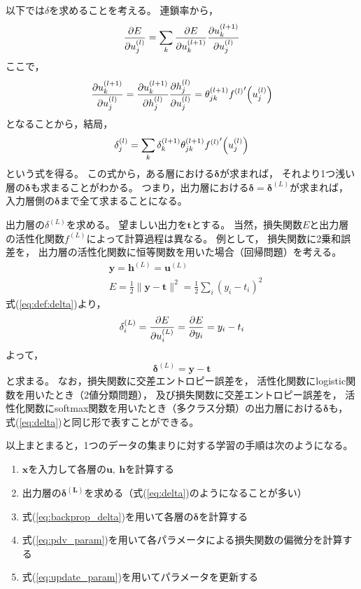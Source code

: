 \documentclass[class=jsarticle, crop=false, dvipdfmx, fleqn]{standalone}
\begin{document}
以下では$\delta$を求めることを考える。
連鎖率から，
\begin{equation}
\pdv{E}{u_j^{(l)}} = \sum_k \pdv{E}{u_k^{(l+1)}} \pdv{u_k^{(l+1)}}{u_{j}^{(l)}}
\end{equation}
ここで，
\begin{equation}
\pdv{u_k^{(l+1)}}{u_{j}^{(l)}}
	= \pdv{u_k^{(l+1)}}{h_{j}^{(l)}} \pdv{h_j^{(l)}}{u_{j}^{(l)}}
	= \theta_{jk}^{(l+1)} {f^{(l)}}^\prime \qty(u_{j}^{(l)})
\end{equation}
となることから，結局，
\begin{equation}
\delta_j^{(l)} = \sum_k \delta_k^{(l+1)} \theta_{jk}^{(l+1)} {f^{(l)}}^\prime \qty(u_{j}^{(l)})
\label{eq:backprop_delta}
\end{equation}
という式を得る。
この式から，ある層における$\bm{\delta}$が求まれば，
それより1つ浅い層の$\bm{\delta}$も求まることがわかる。
つまり，出力層における$\bm{\delta} = \bm{\delta}^{(L)}$が求まれば，
入力層側の$\bm{\delta}$まで全て求まることになる。

出力層の$\delta^{(L)}$を求める。
望ましい出力を$\bm{t}$とする。
当然，損失関数$E$と出力層の活性化関数$f^{(L)}$によって計算過程は異なる。
例として，
損失関数に2乗和誤差を，
出力層の活性化関数に恒等関数を用いた場合（回帰問題）を考える。
\begin{align}
& \bm{y} = \bm{h}^{(L)} = \bm{u}^{(L)} \\
& E = \frac{1}{2} \| \bm{y} - \bm{t} \|^2 = \frac{1}{2} \sum_i (y_i - t_i)^2
\end{align}
式(\ref{eq:def:delta})より，
\begin{equation}
\delta_i^{(L)} = \pdv{E}{u_i^{(L)}} = \pdv{E}{y_i} = y_i - t_i
\end{equation}
よって，
\begin{equation}
\bm{\delta}^{(L)} = \bm{y - t}
\label{eq:delta}
\end{equation}
と求まる。
なお，損失関数に交差エントロピー誤差を，
活性化関数にlogistic関数を用いたとき（2値分類問題），
及び損失関数に交差エントロピー誤差を，
活性化関数にsoftmax関数を用いたとき（多クラス分類）の出力層における$\bm{\delta}$も，
式(\ref{eq:delta})と同じ形で表すことができる。

以上まとまると，1つのデータの集まりに対する学習の手順は次のようになる。

\begin{enumerate}
\item $\bm{x}$を入力して各層の$\bm{u},\ \bm{h}$を計算する
\item 出力層の$\bm{\delta^{(L)}}$を求める（式(\ref{eq:delta})のようになることが多い）
\item 式(\ref{eq:backprop_delta})を用いて各層の$\bm{\delta}$を計算する
\item 式(\ref{eq:pdv_param})を用いて各パラメータによる損失関数の偏微分を計算する
\item 式(\ref{eq:update_param})を用いてパラメータを更新する
\end{enumerate}
\end{document}
